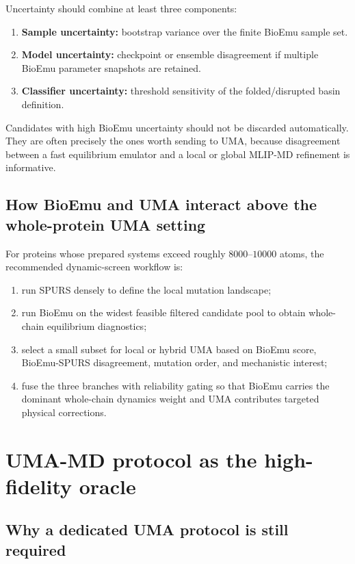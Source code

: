 \documentclass[11pt]{article}
\begin{document}
Uncertainty should combine at least three components:
\begin{enumerate}[leftmargin=1.5em]
    \item \textbf{Sample uncertainty:} bootstrap variance over the finite BioEmu sample set.
    \item \textbf{Model uncertainty:} checkpoint or ensemble disagreement if multiple BioEmu parameter snapshots are retained.
    \item \textbf{Classifier uncertainty:} threshold sensitivity of the folded/disrupted basin definition.
\end{enumerate}
Candidates with high BioEmu uncertainty should not be discarded automatically. They are often precisely the ones worth sending to UMA, because disagreement between a fast equilibrium emulator and a local or global MLIP-MD refinement is informative.

\subsection{How BioEmu and UMA interact above the whole-protein UMA setting}

For proteins whose prepared systems exceed roughly $8000$--$10000$ atoms, the recommended dynamic-screen workflow is:
\begin{enumerate}[leftmargin=1.5em]
    \item run SPURS densely to define the local mutation landscape;
    \item run BioEmu on the widest feasible filtered candidate pool to obtain whole-chain equilibrium diagnostics;
    \item select a small subset for local or hybrid UMA based on BioEmu score, BioEmu-SPURS disagreement, mutation order, and mechanistic interest;
    \item fuse the three branches with reliability gating so that BioEmu carries the dominant whole-chain dynamics weight and UMA contributes targeted physical corrections.
\end{enumerate}

\section{UMA-MD protocol as the high-fidelity oracle}
\label{sec:uma}

\subsection{Why a dedicated UMA protocol is still required}
\end{document}
